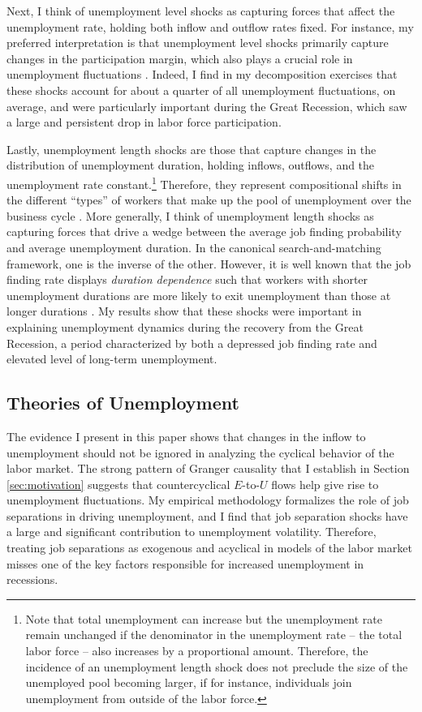 \documentclass[12pt]{article}
\begin{document}
Next, I think of unemployment level shocks as capturing forces that affect the unemployment rate, holding both inflow and outflow rates fixed. For instance, my preferred interpretation is that unemployment level shocks primarily capture changes in the participation margin, which also plays a crucial role in unemployment fluctuations \citep{Elsby:2015aa}. Indeed, I find in my decomposition exercises that these shocks account for about a quarter of all unemployment fluctuations, on average, and were particularly important during the Great Recession, which saw a large and persistent drop in labor force participation.

Lastly, unemployment length shocks are those that capture changes in the distribution of unemployment duration, holding inflows, outflows, and the unemployment rate constant.\footnote{Note that total unemployment can increase but the unemployment rate remain unchanged if the denominator in the unemployment rate -- the total labor force -- also increases by a proportional amount. Therefore, the incidence of an unemployment length shock does not preclude the size of the unemployed pool becoming larger, if for instance, individuals join unemployment from outside of the labor force.} Therefore, they represent compositional shifts in the different ``types'' of workers that make up the pool of unemployment over the business cycle \citep{Ahn:2023aa, Gregory:2025aa}. More generally, I think of unemployment length shocks as capturing forces that drive a wedge between the average job finding probability and average unemployment duration. In the canonical search-and-matching framework, one is the inverse of the other. However, it is well known that the job finding rate displays \textit{duration dependence} such that workers with shorter unemployment durations are more likely to exit unemployment than those at longer durations \citep{Kroft:2013aa, Ahn:2020aa, Ahn:2022aa}. My results show that these shocks were important in explaining unemployment dynamics during the recovery from the Great Recession, a period characterized by both a depressed job finding rate and elevated level of long-term unemployment.

\subsection{Theories of Unemployment}

The evidence I present in this paper shows that changes in the inflow to unemployment should not be ignored in analyzing the cyclical behavior of the labor market. The strong pattern of Granger causality that I establish in Section \ref{sec:motivation} suggests that countercyclical $E$-to-$U$ flows help give rise to unemployment fluctuations. My empirical methodology formalizes the role of job separations in driving unemployment, and I find that job separation shocks have a large and significant contribution to unemployment volatility. Therefore, treating job separations as exogenous and acyclical in models of the labor market misses one of the key factors responsible for increased unemployment in recessions.
\end{document}
